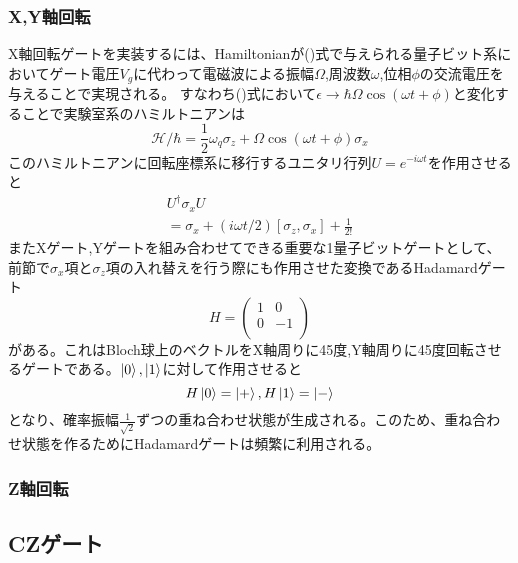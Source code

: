         \subsubsection{X,Y軸回転}
        X軸回転ゲートを実装するには、Hamiltonianが()式で与えられる量子ビット系においてゲート電圧$V_g$に代わって電磁波による振幅$\Omega$,周波数$\omega$,位相$\phi$の交流電圧を与えることで実現される。
        すなわち()式において$\epsilon \to \hbar\Omega \cos(\omega t + \phi)$と変化することで実験室系のハミルトニアンは
        \begin{equation}
            \mathcal{H/\hbar}=\frac{1}{2} \omega_{q} \sigma_{z}+ \Omega \cos(\omega t + \phi)\sigma_{x}
        \end{equation}
        このハミルトニアンに回転座標系に移行するユニタリ行列$U=e^{-i\omega t}$を作用させると
        \begin{equation}
            \begin{aligned}
                U^\dagger \sigma_x U \\
                = \sigma_x+(i\omega t/2)[\sigma_z,\sigma_x]+\frac{1}{2!}
            \end{aligned}
        \end{equation}
        またXゲート,Yゲートを組み合わせてできる重要な1量子ビットゲートとして、前節で$\sigma_x$項と$\sigma_z$項の入れ替えを行う際にも作用させた変換であるHadamardゲート
        \begin{equation}
            H=\left(
            \begin{array}{cc}
                1 & 0 \\
                0 & -1 \\
            \end{array}
            \right)
        \end{equation}
        がある。これはBloch球上のベクトルをX軸周りに45度,Y軸周りに45度回転させるゲートである。$\ket{0},\ket{1}$に対して作用させると
        \begin{equation}
            H \ket{0} = \ket{+}, H \ket{1} = \ket{-}
        \end{equation}
        となり、確率振幅$\frac{1}{\sqrt2}$ずつの重ね合わせ状態が生成される。このため、重ね合わせ状態を作るためにHadamardゲートは頻繁に利用される。

        \subsubsection{Z軸回転}
        
    \subsection{CZゲート}
